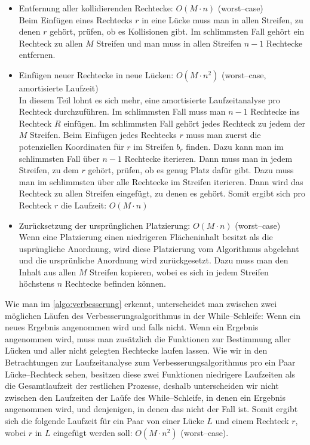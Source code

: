 \begin{itemize}
\begin{itemize}
		\item Entfernung aller kollidierenden Rechtecke: $O(M \cdot n)$ (worst--case)\\
		Beim Einfügen eines Rechtecks $r$ in eine Lücke muss man in allen Streifen, zu denen $r$
		gehört, prüfen, ob es Kollisionen gibt.
		Im schlimmsten Fall gehört ein Rechteck zu allen $M$ Streifen und man muss in allen
		Streifen $n-1$ Rechtecke entfernen.

		\item Einfügen neuer Rechtecke in neue Lücken: $O(M \cdot n^2)$
		(worst--case, amortisierte Laufzeit)\\
		In diesem Teil lohnt es sich mehr, eine amortisierte Laufzeitanalyse pro Rechteck durchzuführen.
		Im schlimmsten Fall muss man $n-1$ Rechtecke ins Rechteck $R$ einfügen.
		Im schlimmsten Fall gehört jedes Rechteck zu jedem der $M$ Streifen.
		Beim Einfügen jedes Rechtecks $r$ muss man zuerst die potenziellen Koordinaten
		für $r$ im Streifen $b_r$ finden. Dazu kann man im schlimmsten Fall über $n-1$ Rechtecke iterieren.
		Dann muss man in jedem Streifen, zu dem $r$ gehört, 
		prüfen, ob es genug Platz dafür gibt.
		Dazu muss man im schlimmsten über alle Rechtecke im Streifen iterieren.
		Dann wird das Rechteck zu allen Streifen eingefügt, zu denen es gehört.
		Somit ergibt sich pro Rechteck $r$ die Laufzeit: $O(M \cdot n)$

		\item Zurücksetzung der ursprünglichen Platzierung: $O(M \cdot n)$ (worst--case)\\
		Wenn eine Platzierung einen niedrigeren Flächeninhalt besitzt als 
		die usprüngliche Anordnung, wird diese Platzierung vom Algorithmus abgelehnt
		und die ursprünliche Anordnung wird zurückgesetzt.
		Dazu muss man den Inhalt aus allen $M$ Streifen kopieren, wobei es sich in jedem Streifen höchstens 
		$n$ Rechtecke befinden können.
	\end{itemize}

\end{itemize}

Wie man im \cref{algo:verbesserung} erkennt, unterscheidet man zwischen zwei möglichen
Läufen des Verbesserungsalgorithmus in der While--Schleife:
Wenn ein neues Ergebnis angenommen wird und falls nicht.
Wenn ein Ergebnis angenommen wird, muss man zusätzlich die Funktionen zur Bestimmung aller Lücken und aller nicht gelegten
Rechtecke laufen lassen.
Wie wir in den Betrachtungen zur Laufzeitanalyse zum Verbesserungsalgorithmus pro ein Paar Lücke--Rechteck 
sehen, besitzen diese zwei Funktionen niedrigere
Laufzeiten als die Gesamtlaufzeit der restlichen Prozesse, deshalb unterscheiden wir
nicht zwischen den Laufzeiten der Laüfe des While--Schleife, in denen ein Ergebnis 
angenommen wird, und denjenigen, in denen das nicht der Fall ist.
Somit ergibt sich die folgende Laufzeit für ein Paar von einer Lücke $L$ und einem Rechteck $r$,
wobei $r$ in $L$ eingefügt werden soll: $O(M \cdot n^2)$ (worst--case).

